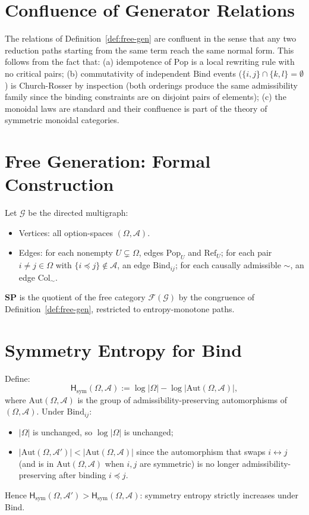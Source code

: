 \documentclass[12pt,a4paper]{article}
\theoremstyle{definition}
\theoremstyle{remark}
\newcommand{\SP}{\mathbf{SP}}
\newcommand{\Pop}{\ensuremath{\mathrm{Pop}}}
\newcommand{\RefOp}{\ensuremath{\mathrm{Ref}}}
\newcommand{\Bind}{\ensuremath{\mathrm{Bind}}}
\newcommand{\Col}{\ensuremath{\mathrm{Col}}}
\begin{document}
\appendix

\section{Confluence of Generator Relations}
\label{app:confluence}

The relations of Definition~\ref{def:free-gen} are confluent in the sense that any
two reduction paths starting from the same term reach the same normal form. This
follows from the fact that:
(a) idempotence of $\Pop$ is a local rewriting rule with no critical pairs;
(b) commutativity of independent $\Bind$ events ($\{i,j\}\cap\{k,l\}=\emptyset$)
is Church-Rosser by inspection (both orderings produce the same admissibility family
since the binding constraints are on disjoint pairs of elements);
(c) the monoidal laws are standard and their confluence is part of the theory of
symmetric monoidal categories.

\section{Free Generation: Formal Construction}
\label{app:free}

Let $\mathcal{G}$ be the directed multigraph:
\begin{itemize}
\item Vertices: all option-spaces $(\Omega,\mathcal{A})$.
\item Edges: for each nonempty $U\subsetneq\Omega$, edges $\Pop_U$ and $\RefOp_U$;
  for each pair $i\ne j\in\Omega$ with $\{i\preceq j\}\notin\mathcal{A}$, an edge
  $\Bind_{ij}$; for each causally admissible $\sim$, an edge $\Col_\sim$.
\end{itemize}
$\SP$ is the quotient of the free category $\mathcal{F}(\mathcal{G})$ by the
congruence of Definition~\ref{def:free-gen}, restricted to entropy-monotone paths.

\section{Symmetry Entropy for Bind}
\label{app:symm-entropy}

Define:
\[
  \mathsf{H}_{\mathrm{sym}}(\Omega,\mathcal{A})
  := \log|\Omega| - \log|\mathrm{Aut}(\Omega,\mathcal{A})|,
\]
where $\mathrm{Aut}(\Omega,\mathcal{A})$ is the group of admissibility-preserving
automorphisms of $(\Omega,\mathcal{A})$. Under $\Bind_{ij}$:
\begin{itemize}
\item $|\Omega|$ is unchanged, so $\log|\Omega|$ is unchanged;
\item $|\mathrm{Aut}(\Omega,\mathcal{A}')|<|\mathrm{Aut}(\Omega,\mathcal{A})|$ since
  the automorphism that swaps $i\leftrightarrow j$ (and is in $\mathrm{Aut}(\Omega,
  \mathcal{A})$ when $i,j$ are symmetric) is no longer admissibility-preserving after
  binding $i\preceq j$.
\end{itemize}
Hence $\mathsf{H}_{\mathrm{sym}}(\Omega,\mathcal{A}')>\mathsf{H}_{\mathrm{sym}}(\Omega,
\mathcal{A})$: symmetry entropy strictly increases under Bind.
\end{document}

